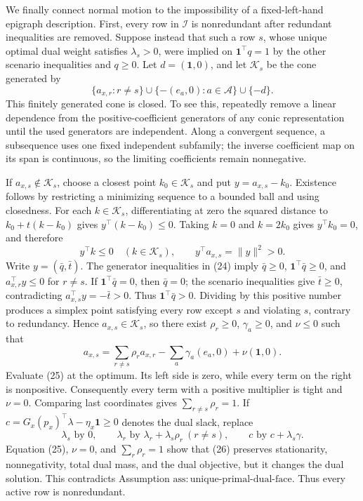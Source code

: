 We finally connect normal motion to the impossibility of a fixed-left-hand
epigraph description.  First, every row in \(\mathcal I\) is nonredundant
after redundant inequalities are removed.  Suppose instead that such a row
\(s\), whose unique optimal dual weight satisfies \(\lambda_s>0\), were
implied on \(\mathbf 1^\top q=1\) by the other scenario inequalities and
\(q\geq0\).  Let \(d=(\mathbf 1,0)\), and let \(\mathcal K_s\) be the cone
generated by
\[
 \{a_{x,r}:r\neq s\}
 \cup\{-(e_a,0):a\in\mathcal A\}
 \cup\{-d\}.
\]
This finitely generated cone is closed.  To see this, repeatedly remove a
linear dependence from the positive-coefficient generators of any conic
representation until the used generators are independent.  Along a
convergent sequence, a subsequence uses one fixed independent subfamily; the
inverse coefficient map on its span is continuous, so the limiting
coefficients remain nonnegative.

If \(a_{x,s}\notin\mathcal K_s\), choose a closest point
\(k_0\in\mathcal K_s\) and put \(y=a_{x,s}-k_0\).  Existence follows by
restricting a minimizing sequence to a bounded ball and using closedness.
For each \(k\in\mathcal K_s\), differentiating at zero the squared distance
to \(k_0+t(k-k_0)\) gives \(y^\top(k-k_0)\leq0\).  Taking \(k=0\) and
\(k=2k_0\) gives \(y^\top k_0=0\), and therefore
\[
 y^\top k\leq0\quad(k\in\mathcal K_s),
 \qquad y^\top a_{x,s}=\|y\|^2>0.
 \tag{24}
\]
Write \(y=(\bar q,\bar t)\).  The generator inequalities in (24) imply
\(\bar q\geq0\), \(\mathbf 1^\top\bar q\geq0\), and
\(a_{x,r}^\top y\leq0\) for \(r\neq s\).  If
\(\mathbf 1^\top\bar q=0\), then \(\bar q=0\); the scenario inequalities
give \(\bar t\geq0\), contradicting
\(a_{x,s}^\top y=-\bar t>0\).  Thus
\(\mathbf 1^\top\bar q>0\).  Dividing by this positive number produces a
simplex point satisfying every row except \(s\) and violating \(s\), contrary
to redundancy.  Hence \(a_{x,s}\in\mathcal K_s\), so there exist
\(\rho_r\geq0\), \(\gamma_a\geq0\), and \(\nu\leq0\) such that
\[
 a_{x,s}
 =\sum_{r\neq s}\rho_r a_{x,r}
  -\sum_a\gamma_a(e_a,0)+\nu(\mathbf 1,0).
 \tag{25}
\]
Evaluate (25) at the optimum.  Its left side is zero, while every term on the
right is nonpositive.  Consequently every term with a positive multiplier is
tight and \(\nu=0\).  Comparing last coordinates gives
\(\sum_{r\neq s}\rho_r=1\).  If
\(c=G_x(p_x)^\top\lambda-\eta_x\mathbf 1\geq0\) denotes the dual slack,
replace
\[
 \lambda_s\text{ by }0,
 \qquad
 \lambda_r\text{ by }\lambda_r+\lambda_s\rho_r\ (r\neq s),
 \qquad
 c\text{ by }c+\lambda_s\gamma.
 \tag{26}
\]
Equation (25), \(\nu=0\), and \(\sum_r\rho_r=1\) show that (26) preserves
stationarity, nonnegativity, total dual mass, and the dual objective, but it
changes the dual solution.  This contradicts Assumption
\(\mathrm{ass{:}unique\mbox{-}primal\mbox{-}dual\mbox{-}face}\).  Thus every
active row is nonredundant.

